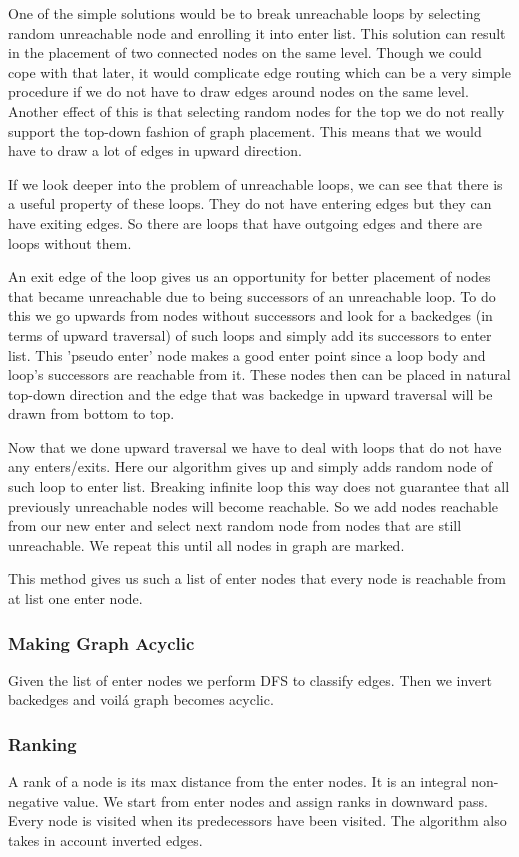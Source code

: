 \documentclass[11pt,twoside,a4paper]{article}
\begin{document}
One of the simple solutions would be to break unreachable loops by selecting random unreachable node and enrolling it into enter list. This solution can result in the placement of two connected nodes on the same level. Though we could cope with that later, it would complicate edge routing which can be a very simple procedure if we do not have to draw edges around nodes on the same level. Another effect of this is that selecting random nodes for the top we do not really support the top-down fashion of graph placement. This means that we would have to draw a lot of edges in upward direction.

If we look deeper into the problem of unreachable loops, we can see that there is a useful property of these loops. They do not have entering edges but they can have exiting edges. So there are loops that have outgoing edges and there are loops without them. 

An exit edge of the loop gives us an opportunity for better placement of nodes that became unreachable due to being successors of an unreachable loop. To do this we go upwards from nodes without successors and look for a backedges (in terms of upward traversal) of such loops and simply add its successors to enter list. This 'pseudo enter' node makes a good enter point since a loop body and loop's successors are reachable from it. These nodes then can be placed in natural top-down direction and the edge that was backedge in upward traversal will be drawn from bottom to top.

Now that we done upward traversal we have to deal with loops that do not have any enters/exits. Here our algorithm gives up and simply adds random node of such loop to enter list. Breaking infinite loop this way does not guarantee that all previously unreachable nodes will become reachable. So we add nodes reachable from our new enter and select next random node from nodes that are still unreachable. We repeat this until all nodes in graph are marked.

This method gives us such a list of enter nodes that every node is reachable from at list one enter node.

\subsubsection{Making Graph Acyclic}
Given the list of enter nodes we perform DFS to classify edges. Then we invert backedges and voil\'a graph becomes acyclic.

\subsubsection{Ranking}
A rank of a node is its max distance from the enter nodes. It is an integral non-negative value. We start from enter nodes and assign ranks in downward pass. Every node is visited when its predecessors have been visited. The algorithm also takes in account inverted edges.
\end{document}
